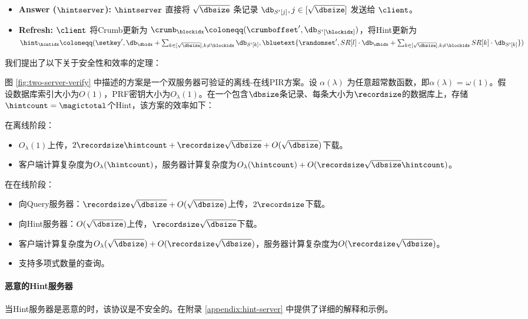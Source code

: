 \begin{figure*}
\begin{mdframed}
\begin{itemize}
\begin{itemize}
                  \end{itemize}
            \item \textbf{Answer ($\hintserver$):} $\hintserver$ 直接将 $\sqrt{\dbsize}$ 条记录 $\db_{S'[j]}, j\in [\sqrt{\dbsize}]$ 发送给 $\client$。
            \item \textbf{Refresh:} $\client$ 将Crumb更新为 $\crumb_\blockidx \coloneqq  (\crumboffset', \db_{S'[\blockidx]})$，将Hint更新为 $\hint_\hintidx \coloneqq  (\setkey',\db_\dbidx + \sum_{k\in [\sqrt{\dbsize}],k\neq \blockidx}\db_{S'[k]}, \bluetext{\randomset', SR[l]\cdot \db_\dbidx + \sum_{k\in [\sqrt{\dbsize}],k\neq \blockidx}SR[k]\cdot \db_{S'[k]}})$
        \end{itemize}
    \end{mdframed}
    \caption{两服务器PIR协议。蓝色部分是验证过程。向$\queryserver$ 和 $\hintserver$ 进行 $Query$ 的算法仅为清晰起见进行了分离。它们可以并行运行，不需要额外的轮次。}
    \label{fig:two-server-verify}
\end{figure*}

我们提出了以下关于安全性和效率的定理：

\begin{theorem}
    \label{thm:1}
    图 \ref{fig:two-server-verify} 中描述的方案是一个双服务器可验证的离线-在线PIR方案。设 $\alpha(\lambda)$ 为任意超常数函数，即$\alpha(\lambda)$ = $\omega(1)$。假设数据库索引大小为$O(1)$，PRF密钥大小为$O_\lambda(1)$。在一个包含$\dbsize$条记录、每条大小为$\recordsize$的数据库上，存储$\hintcount = \magictotal$个Hint，该方案的效率如下：
    
    \noindent 在离线阶段：
    \begin{itemize}[itemsep=0em]
        \item $O_\lambda(1)$上传，$2\recordsize\hintcount + \recordsize\sqrt{\dbsize} + O(\sqrt{\dbsize})$下载。
        \item 客户端计算复杂度为$O_\lambda(\hintcount)$，服务器计算复杂度为$O_\lambda(\hintcount) + O(\recordsize\sqrt{\dbsize}\hintcount)$。
    \end{itemize}
    在在线阶段：
    \begin{itemize}[itemsep=0em]
        \item 向Query服务器：$\recordsize\sqrt{\dbsize} + O(\sqrt{\dbsize})$上传，$2\recordsize$下载。
        \item 向Hint服务器：$O(\sqrt{\dbsize})$上传，$\recordsize\sqrt{\dbsize}$下载。
        \item 客户端计算复杂度为$O_\lambda(\sqrt{\dbsize}) + O(\recordsize\sqrt{\dbsize})$，服务器计算复杂度为$O(\recordsize\sqrt{\dbsize})$。
        \item 支持多项式数量的查询。
    \end{itemize}
\end{theorem}

\paragraph{恶意的Hint服务器}
当Hint服务器是恶意的时，该协议是不安全的。在附录 \ref{appendix:hint-server} 中提供了详细的解释和示例。